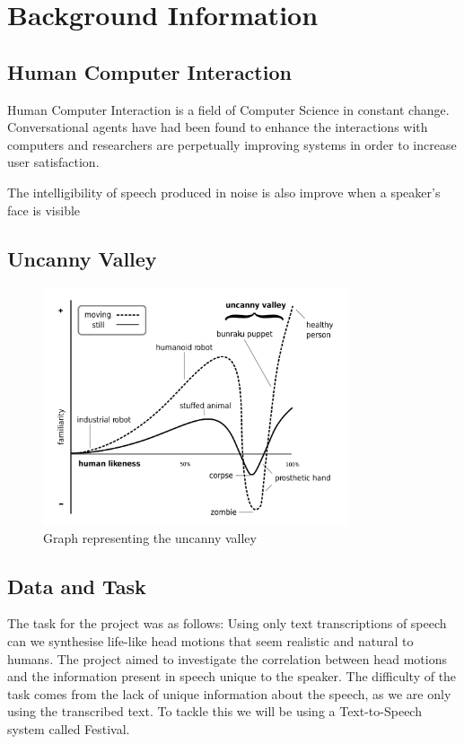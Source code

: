 \documentclass[bsc,frontabs,twoside,singlespacing,parskip]{infthesis}
\begin{document}
\chapter{Background Information}

\section{Human Computer Interaction}

Human Computer Interaction is a field of Computer Science in constant change. Conversational agents have had been found to enhance the interactions with computers  \cite{conv_agents}  and researchers are perpetually improving systems in order to increase user satisfaction. 

The intelligibility of speech produced in noise is also improve when a speaker's face is visible \cite{emotion_head_motion}

\section{Uncanny Valley}

\begin{figure}[h!]
	\caption{Graph representing the uncanny valley}
	\centering
	\includegraphics[width=0.8\textwidth]{uncanny}
\end{figure}

\section{Data and Task}



The task for the project was as follows: Using only text transcriptions of speech can we synthesise life-like head motions that seem realistic and natural to humans. The project aimed to investigate the correlation between head motions and the information present in speech unique to the speaker. The difficulty of the task comes from the lack of unique information about the speech, as we are only using the transcribed text. To tackle this we will be using a Text-to-Speech system called Festival.
\end{document}
